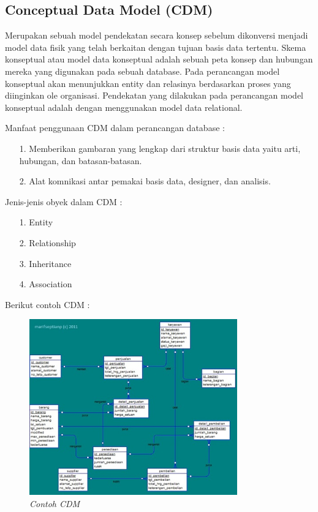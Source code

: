 \documentclass{jtetiproposalskripsi}
\begin{document}
\subsection{Conceptual Data Model (CDM)}
Merupakan sebuah model pendekatan secara konsep sebelum dikonversi menjadi model data fisik yang telah berkaitan dengan tujuan basis data tertentu. Skema konseptual atau model data konseptual adalah sebuah peta konsep dan hubungan mereka yang digunakan pada sebuah database. Pada perancangan model konseptual akan menunjukkan entity dan relasinya berdasarkan proses yang diinginkan ole organisasi. Pendekatan yang dilakukan pada perancangan model konseptual adalah dengan menggunakan model data relational.

Manfaat penggunaan CDM dalam perancangan database :
\begin{itemize}

\item[1.] Memberikan gambaran yang lengkap dari struktur basis data yaitu arti, hubungan, dan batasan-batasan.
\item[2.] Alat komnikasi antar pemakai basis data, designer, dan analisis.
\end{itemize}

Jenis-jenis obyek dalam CDM :
\begin{itemize}

\item[1.]	Entity
\item[2.]	Relationship
\item[3.]	Inheritance
\item[4.]	Association
\end{itemize}

Berikut contoh CDM :
\begin{figure}[ht!]
\centering
\includegraphics[width=0.8\textwidth]{gambar/CDM}
\caption{\textit{Contoh CDM}}
\label{wsn}
\end{figure}
\newpage
\end{document}
